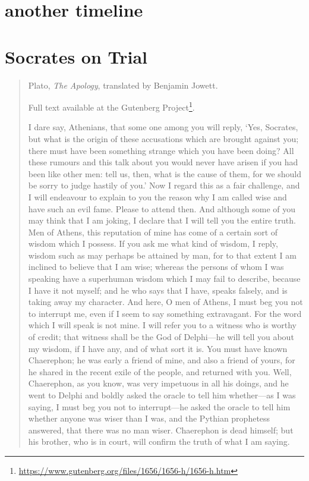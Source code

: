 \documentclass[
  12pt, openany]{book}
\makeatletter
\renewcommand{\href}[2]{#2\footnote{\url{#1}}}
\newenvironment{kframe}{%
\medskip{}
\setlength{\fboxsep}{.8em}
 \def\at@end@of@kframe{}%
 \ifinner\ifhmode%
  \def\at@end@of@kframe{\end{minipage}}%
  \begin{minipage}{\columnwidth}%
 \fi\fi%
 \def\FrameCommand##1{\hskip\@totalleftmargin \hskip-\fboxsep
 \colorbox{shadecolor}{##1}\hskip-\fboxsep
     \hskip-\linewidth \hskip-\@totalleftmargin \hskip\columnwidth}%
 \MakeFramed {\advance\hsize-\width
   \@totalleftmargin\z@ \linewidth\hsize
   \@setminipage}}%
 {\par\unskip\endMakeFramed%
 \at@end@of@kframe}
\newenvironment{rmdblock}[1]
  {
  \begin{itemize}
  \renewcommand{\labelitemi}{
    \raisebox{-.7\height}[0pt][0pt]{
      {\setkeys{Gin}{width=3em,keepaspectratio}\texttt{[image: img/\#1]}}
    }
  }
  \setlength{\fboxsep}{1em}
  \begin{kframe}
  \item
  }
  {
  \end{kframe}
  \end{itemize}
  }
\newenvironment{note}
  {\begin{rmdblock}{note}}
  {\end{rmdblock}}
\newenvironment{passage}{\begin{quotation}}{\end{quotation}}
\makeatother
\begin{document}
\hypertarget{another-timeline}{%
\section{another timeline}\label{another-timeline}}

\hypertarget{socrates-on-trial}{%
\section{Socrates on Trial}\label{socrates-on-trial}}

\begin{passage}

\begin{note}

Plato, \emph{The Apology}, translated by Benjamin Jowett.

Full text available at the \href{https://www.gutenberg.org/files/1656/1656-h/1656-h.htm}{Gutenberg Project}.

\end{note}

I dare say, Athenians, that some one among you will reply, `Yes, Socrates, but what is the origin of these accusations which are brought against you; there must have been something strange which you have been doing? All these rumours and this talk about you would never have arisen if you had been like other men: tell us, then, what is the cause of them, for we should be sorry to judge hastily of you.' Now I regard this as a fair challenge, and I will endeavour to explain to you the reason why I am called wise and have such an evil fame. Please to attend then. And although some of you may think that I am joking, I declare that I will tell you the entire truth. Men of Athens, this reputation of mine has come of a certain sort of wisdom which I possess. If you ask me what kind of wisdom, I reply, wisdom such as may perhaps be attained by man, for to that extent I am inclined to believe that I am wise; whereas the persons of whom I was speaking have a superhuman wisdom which I may fail to describe, because I have it not myself; and he who says that I have, speaks falsely, and is taking away my character. And here, O men of Athens, I must beg you not to interrupt me, even if I seem to say something extravagant. For the word which I will speak is not mine. I will refer you to a witness who is worthy of credit; that witness shall be the God of Delphi---he will tell you about my wisdom, if I have any, and of what sort it is. You must have known Chaerephon; he was early a friend of mine, and also a friend of yours, for he shared in the recent exile of the people, and returned with you. Well, Chaerephon, as you know, was very impetuous in all his doings, and he went to Delphi and boldly asked the oracle to tell him whether---as I was saying, I must beg you not to interrupt---he asked the oracle to tell him whether anyone was wiser than I was, and the Pythian prophetess answered, that there was no man wiser. Chaerephon is dead himself; but his brother, who is in court, will confirm the truth of what I am saying.

\end{passage}
\end{document}
